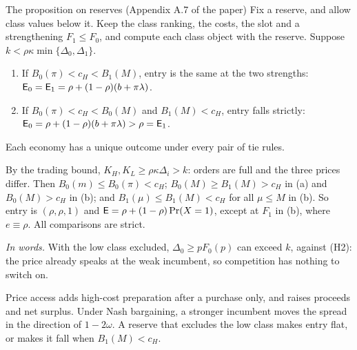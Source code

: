 {\small
\begin{paperresult}{The proposition on reserves (Appendix A.7 of the paper)}
Fix a reserve, and allow class values below it. Keep the class ranking, the costs, the slot and a strengthening
\(F_1\le F_0\), and compute each class object with the reserve. Suppose \(k<\rho\kappa\min\{\Delta_0,\Delta_1\}\).
\begin{enumerate}[label=(\alph*),leftmargin=2em,nosep]
\item If \(B_0(\pi)<c_H<B_1(M)\), entry is the same at the two strengths:
\(\mathsf{E}_0=\mathsf{E}_1=\rho+(1-\rho)(b+\pi\lambda)\).
\item If \(B_0(\pi)<c_H<B_0(M)\) and \(B_1(M)<c_H\), entry falls strictly:
\(\mathsf{E}_0=\rho+(1-\rho)(b+\pi\lambda)>\rho=\mathsf{E}_1\).
\end{enumerate}
Each economy has a unique outcome under every pair of tie rules.
\end{paperresult}}

{\small\begin{derivation}[proof]
By the trading bound, \(K_H,K_L\ge\rho\kappa\Delta_i>k\): orders are full and the three prices differ. Then \(B_0(m)\le B_0(\pi)<c_H\); \(B_0(M)\ge B_1(M)>c_H\) in (a) and \(B_0(M)>c_H\) in (b); and
\(B_1(\mu)\le B_1(M)<c_H\) for all \(\mu\le M\) in (b). So entry is \((\rho,\rho,1)\) and
\(\mathsf{E}=\rho+(1-\rho)\Pr(X=1)\), except at \(F_1\) in (b), where \(e\equiv\rho\). All comparisons are strict.
\end{derivation}}

\emph{In words.} With the low class excluded, \(\Delta_0\ge pF_0(p)\) can exceed \(k\), against (H2): the price
already speaks at the weak incumbent, so competition has nothing to switch on.

\begin{chaptersummary}
Price access adds high-cost preparation after a purchase only, and raises proceeds and net surplus. Under Nash
bargaining, a stronger incumbent moves the spread in the direction of \(1-2\omega\). A reserve that excludes the low
class makes entry flat, or makes it fall when \(B_1(M)<c_H\).
\end{chaptersummary}
